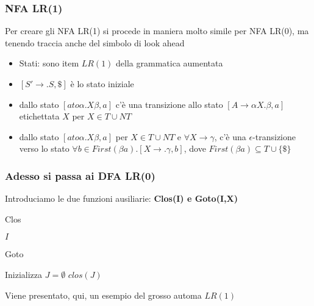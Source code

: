 \subsubsection{NFA LR(1)}

Per creare gli NFA LR(1) si procede in maniera molto simile per NFA LR(0), ma tenendo traccia anche del simbolo di look ahead
\begin{itemize}
    \item Stati: sono item $LR(1)$ della grammatica aumentata
    \item $[S'\to.S, \$]$ è lo stato iniziale
    \item dallo stato $[ato\alpha.X\beta,a]$ c'è una transizione allo stato $[A\to \alpha X.\beta,a]$ etichettata $X$ per $X\in T\cup NT$
    \item dallo stato $[ato\alpha.X\beta,a]$ per $X\in T\cup NT$ e $\forall X\to\gamma$, c'è una $\epsilon$-transizione verso lo stato $\forall b\in First(\beta a).[X\to .\gamma, b]$, dove $First(\beta a)\subseteq T\cup\{\$\}$
\end{itemize}

\subsubsection{Adesso si passa ai DFA LR(0)}

Introduciamo le due funzioni ausiliarie: \textbf{Clos(I) e Goto(I,X)}

\begin{algorithm}
    \caption{Clos}

    \Return $I$\;
\end{algorithm}

\begin{algorithm}
    \caption{Goto}

    Inizializza $J=\emptyset$\;
    \Return $clos(J)$\;
\end{algorithm}

Viene presentato, qui, un esempio del grosso automa $LR(1)$


